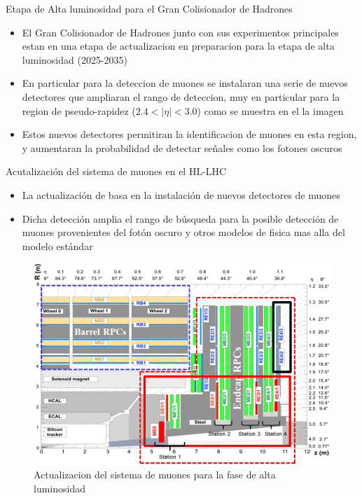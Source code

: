 \begin{frame}{Etapa de Alta luminosidad para el Gran Colisionador de Hadrones}
    \begin{itemize}
        \item El Gran Colisionador de Hadrones junto con sus experimentos principales estan en una etapa de actualizacion en preparacion para la etapa de alta luminosidad (2025-2035) 
        \item En particular para la deteccion de muones se instalaran una serie de nuevos detectores que ampliaran el rango de deteccion, muy en particular para la region de pseudo-rapidez ($2.4<|\eta|<3.0$) como se muestra en el la imagen
        \item Estos nuevos detectores permitiran la identificacion de muones en esta region, y aumentaran la probabilidad de detectar se\~nales como los fotones oscuros
    \end{itemize}
\end{frame}

\begin{frame}{Acutalizaci\'on del sistema de muones en el HL-LHC}

\begin{itemize}
    \item La actualizaci\'on de basa en la instalaci\'on de nuevos detectores de muones 
    \item Dicha detecci\'on amplia el rango de b\'usqueda para la posible detecci\'on de muones provenientes del fot\'on oscuro y otros modelos de fisica mas alla del modelo est\'andar
\end{itemize}

\begin{figure}
    \centering
    \includegraphics[width=1\textwidth]{muon_phase-2.png}
    \caption{Actualizacion del sistema de muones para la fase de alta luminosidad}
    \label{fig:my_label}
\end{figure}
    
\end{frame}


